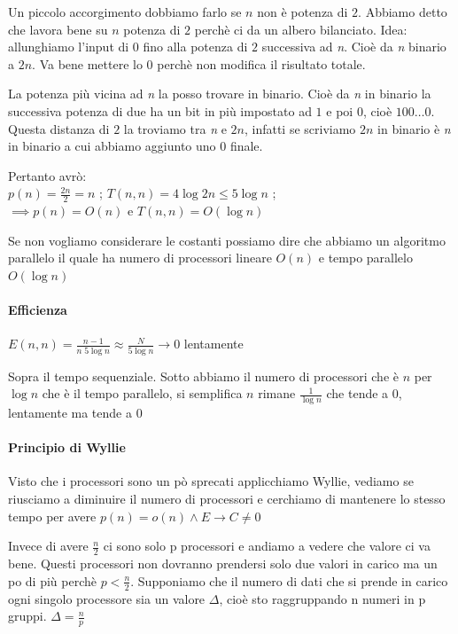 \begin{osservazione}
    Un piccolo accorgimento dobbiamo farlo se $n$ non è potenza di $2$. Abbiamo detto che lavora bene su $n$ potenza di $2$ perchè ci da un albero bilanciato. Idea: allunghiamo l'input di $0$ fino alla potenza di $2$ successiva ad \textit{n}. Cioè da \textit{n} binario a $2n$. Va bene mettere lo $0$ perchè non modifica il risultato totale. 

    La potenza più vicina ad \textit{n} la posso trovare in binario. Cioè da \textit{n} in binario la successiva potenza di due ha un bit in più impostato ad $1$ e poi $0$, cioè $1 0 0 \dots 0$. Questa distanza di $2$ la troviamo tra \textit{n} e $2n$, infatti se scriviamo $2n$ in binario è \textit{n} in binario a cui abbiamo aggiunto uno $0$ finale.

    Pertanto avrò:\\
    $p(n) = \frac{2n}{2} = n$ ; 
    $T(n,n) = 4 \log 2n \leq 5 \log n$ ;\\
    $\implies p(n) = O(n)$ e $T(n,n) = O(\log n)$

    Se non vogliamo considerare le costanti possiamo dire che abbiamo un algoritmo parallelo il quale ha numero di processori lineare $O(n)$ e tempo parallelo $O(\log n)$

    \paragraph{Efficienza}
    $E(n,n) = \frac{n-1}{n\;5\log n} \approx \frac{N}{5 \log n} \rightarrow 0$ lentamente
    
    Sopra il tempo sequenziale. Sotto abbiamo il numero di processori che è $n$ per $\log n$ che è il tempo parallelo, si  semplifica $n$ rimane $\frac{1}{\log n}$ che tende a $0$, lentamente ma tende a $0$
\end{osservazione}

\paragraph{Principio di Wyllie}
Visto che i processori sono un pò sprecati applicchiamo Wyllie, vediamo se riusciamo a diminuire il numero di processori e cerchiamo di mantenere lo stesso tempo per avere $p(n) = o(n) \wedge E \rightarrow C \neq 0$

Invece di avere $\frac{n}{2}$ ci sono solo p processori e andiamo a vedere che valore ci va bene. Questi processori non dovranno prendersi solo due valori in carico ma un po di più perchè $p < \frac{n}{2}$. Supponiamo che il numero di dati che si prende in carico ogni singolo processore sia un valore $\Delta$, cioè sto raggruppando n numeri in p gruppi. $\Delta = \frac{n}{p}$

